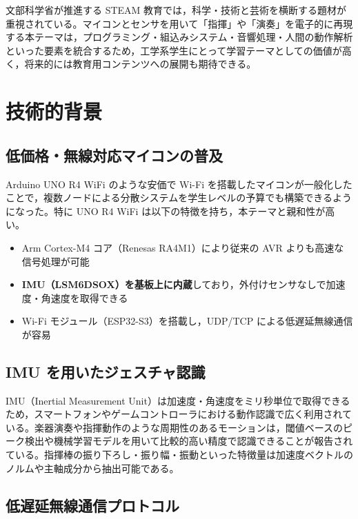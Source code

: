 文部科学省が推進する STEAM 教育では，科学・技術と芸術を横断する題材が重視されている\cite{mext_steam}。マイコンとセンサを用いて「指揮」や「演奏」を電子的に再現する本テーマは，プログラミング・組込みシステム・音響処理・人間の動作解析といった要素を統合するため，工学系学生にとって学習テーマとしての価値が高く，将来的には教育用コンテンツへの展開も期待できる。

\section{技術的背景}
\label{sec:technical_background}

\subsection{低価格・無線対応マイコンの普及}

Arduino UNO R4 WiFi のような安価で Wi-Fi を搭載したマイコンが一般化したことで，複数ノードによる分散システムを学生レベルの予算でも構築できるようになった\cite{arduino_uno_r4}。特に UNO R4 WiFi は以下の特徴を持ち，本テーマと親和性が高い。

\begin{itemize}
  \item Arm Cortex-M4 コア（Renesas RA4M1）により従来の AVR よりも高速な信号処理が可能
  \item \textbf{IMU（LSM6DSOX）を基板上に内蔵}しており，外付けセンサなしで加速度・角速度を取得できる
  \item Wi-Fi モジュール（ESP32-S3）を搭載し，UDP/TCP による低遅延無線通信が容易
\end{itemize}

\subsection{IMU を用いたジェスチャ認識}

IMU（Inertial Measurement Unit）は加速度・角速度をミリ秒単位で取得できるため，スマートフォンやゲームコントローラにおける動作認識で広く利用されている\cite{lsm6dsox}。楽器演奏や指揮動作のような周期性のあるモーションは，閾値ベースのピーク検出や機械学習モデルを用いて比較的高い精度で認識できることが報告されている\cite{nintendo_wiimusic,imu_gesture_survey}。指揮棒の振り下ろし・振り幅・振動といった特徴量は加速度ベクトルのノルムや主軸成分から抽出可能である。

\subsection{低遅延無線通信プロトコル}


